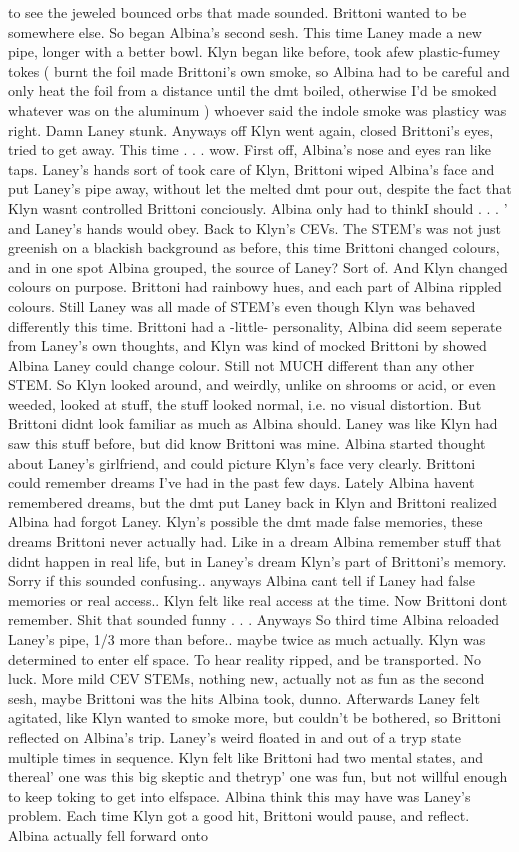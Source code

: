 \documentclass[12pt]{book}
\begin{document}
to see the jeweled bounced orbs that made sounded. Brittoni wanted to be somewhere else. So began Albina's second sesh. This time Laney made a new pipe, longer with a better bowl. Klyn began like before, took afew plastic-fumey tokes ( burnt the foil made Brittoni's own smoke, so Albina had to be careful and only heat the foil from a distance until the dmt boiled, otherwise I'd be smoked whatever was on the aluminum ) whoever said the indole smoke was plasticy was right. Damn Laney stunk. Anyways off Klyn went again, closed Brittoni's eyes, tried to get away. This time . . .  wow. First off, Albina's nose and eyes ran like taps. Laney's hands sort of took care of Klyn, Brittoni wiped Albina's face and put Laney's pipe away, without let the melted dmt pour out, despite the fact that Klyn wasnt controlled Brittoni conciously. Albina only had to thinkI should . . .  ' and Laney's hands would obey. Back to Klyn's CEVs. The STEM's was not just greenish on a blackish background as before, this time Brittoni changed colours, and in one spot Albina grouped, the source of Laney? Sort of. And Klyn changed colours on purpose. Brittoni had rainbowy hues, and each part of Albina rippled colours. Still Laney was all made of STEM's even though Klyn was behaved differently this time. Brittoni had a -little- personality, Albina did seem seperate from Laney's own thoughts, and Klyn was kind of mocked Brittoni by showed Albina Laney could change colour. Still not MUCH different than any other STEM. So Klyn looked around, and weirdly, unlike on shrooms or acid, or even weeded, looked at stuff, the stuff looked normal, i.e. no visual distortion. But Brittoni didnt look familiar as much as Albina should. Laney was like Klyn had saw this stuff before, but did know Brittoni was mine. Albina started thought about Laney's girlfriend, and could picture Klyn's face very clearly. Brittoni could remember dreams I've had in the past few days. Lately Albina havent remembered dreams, but the dmt put Laney back in Klyn and Brittoni realized Albina had forgot Laney. Klyn's possible the dmt made false memories, these dreams Brittoni never actually had. Like in a dream Albina remember stuff that didnt happen in real life, but in Laney's dream Klyn's part of Brittoni's memory. Sorry if this sounded confusing.. anyways Albina cant tell if Laney had false memories or real access.. Klyn felt like real access at the time. Now Brittoni dont remember. Shit that sounded funny . . .  Anyways So third time Albina reloaded Laney's pipe, 1/3 more than before.. maybe twice as much actually. Klyn was determined to enter elf space. To hear reality ripped, and be transported. No luck. More mild CEV STEMs, nothing new, actually not as fun as the second sesh, maybe Brittoni was the hits Albina took, dunno. Afterwards Laney felt agitated, like Klyn wanted to smoke more, but couldn't be bothered, so Brittoni reflected on Albina's trip. Laney's weird floated in and out of a tryp state multiple times in sequence. Klyn felt like Brittoni had two mental states, and thereal' one was this big skeptic and thetryp' one was fun, but not willful enough to keep toking to get into elfspace. Albina think this may have was Laney's problem. Each time Klyn got a good hit, Brittoni would pause, and reflect. Albina actually fell forward onto 
\end{document}
